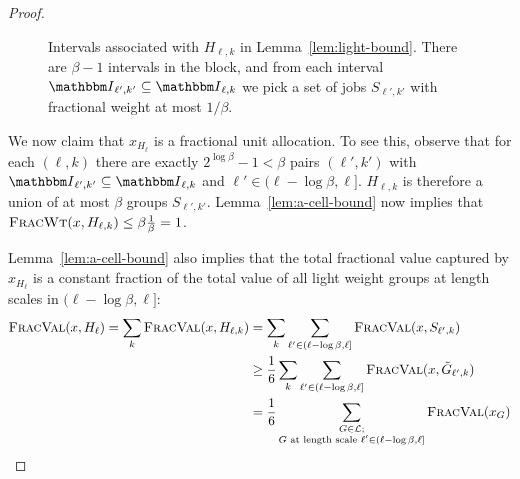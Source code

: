 \begin{proof}
\begin{figure}
    \caption{Intervals associated with $H_{\ell,k}$ in
       Lemma~\ref{lem:light-bound}. There are $\beta-1$ intervals in the block,
       and from each interval $\Int_{\ell',k'}\subseteq \Int_{\ell,k}$ we pick
       a set of jobs $S_{\ell',k'}$ with fractional weight at most $1/\beta$.}
    \label{fig:intervalblock}
\end{figure}

   We now claim that $x_{H_\ell}$ is a fractional unit allocation. To
   see this, observe that for each $(\ell,k)$ there are exactly
   $2^{\log\beta}-1<\beta$ pairs $(\ell',k')$ with
   $\Int_{\ell',k'}\subseteq \Int_{\ell,k}$ and
   $\ell'\in (\ell-\log\beta, \ell]$. $H_{\ell,k}$ is therefore a
   union of at most $\beta$ groups
   $S_{\ell',k'}$. Lemma~\ref{lem:a-cell-bound} now implies that
   ${\normalfont\textsc{FracWt}}(x, H_{\ell,k})\le \beta \frac 1\beta = 1$.

   Lemma~\ref{lem:a-cell-bound} also implies that the total fractional
   value captured by $x_{H_\ell}$ is a constant fraction of the total
   value of all light weight groups at length scales in
   $(\ell-\log\beta, \ell]$: 
   \begin{align*}
     {\normalfont\textsc{FracVal}}(x,H_\ell) = \sum_k {\normalfont\textsc{FracVal}}(x,H_{\ell,k}) & = \sum_k 
       \sum_{\ell'\in (\ell-\log\beta, \ell]} {\normalfont\textsc{FracVal}}(x, S_{\ell',k})\\
     & \ge \frac 16 \sum_k 
       \sum_{\ell'\in (\ell-\log\beta, \ell]}{\normalfont\textsc{FracVal}}(x, {\tilde{G}}_{\ell',k})\\
     & = \frac 16 \sum_{\substack{G\in {\mathcal{L}};\\ G \text{ at length scale } \ell'\in (\ell-\log\beta, \ell]}}{\normalfont\textsc{FracVal}}(x_G)
   \end{align*}


\end{proof}
